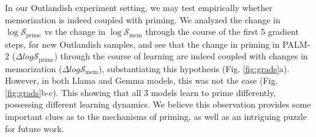 \documentclass[11pt, a4paper, logo, copyright]{googledeepmind}
\newcommand{\mc}[1]{\mathcal{#1}}
\theoremstyle{plain}
\newtheorem{theorem}{Theorem}[section]
\theoremstyle{definition}
\theoremstyle{remark}
\begin{document}

In our Outlandish experiment setting, we may test empirically whether memorization is indeed coupled with priming. We analyzed the change in $\log \mathcal{S}_\text{prime}$ vs the change in $\log \mathcal{S}_\text{mem}$ through the course of the first 5 gradient steps, for new Outlandish samples, and see that the change in priming in PALM-2 ($\Delta log \mathcal{S}_\text{prime}$) through the course of learning are indeed coupled with changes in memorization ($\Delta log \mathcal{S}_\text{mem}$), substantiating this hypothesis (Fig. \ref{fig:grads}a). However, in both Llama and Gemma models, this was not the case (Fig. \ref{fig:grads}b-c). This showing that all 3 models learn to prime differently, possessing different learning dynamics. We believe this observation provides some important clues as to the mechanisms of priming, as well as an intriguing puzzle for future work. 
\end{document}
